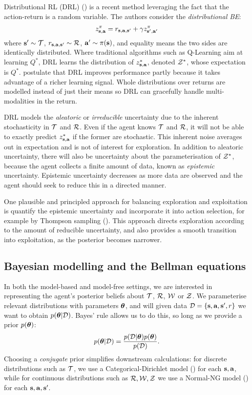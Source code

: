 \documentclass{article}
\begin{document}
Distributional RL (DRL) (\cite{distperrl}) is a recent method leveraging the fact that the action-return is a random variable. The authors consider the \textit{distributional BE}:
\begin{align} \label{eq:distributional}
z^\pi_{\mathbf{s}, \mathbf{a}} = r_{\mathbf{s}, \mathbf{a}, \mathbf{s}'} + \gamma z^\pi_{\mathbf{s}', \mathbf{a}'}
\end{align}
where $\mathbf{s}' \sim \mathcal{T}$, $r_{\mathbf{s}, \mathbf{a}, \mathbf{s}'} \sim \mathcal{R}$, $\mathbf{a}' \sim \pi(\mathbf{s})$, and equality means the two sides are identically distributed. Where traditional algorithms such as Q-Learning aim at learning $Q^*$, DRL learns the distribution of $z^*_{\mathbf{s}, \mathbf{a}}$, denoted $\mathcal{Z}^*$, whose expectation is $Q^*$. \cite{distperrl} postulate that DRL improves performance partly because it takes advantage of a richer learning signal. Whole distributions over returns are modelled instead of just their means so DRL can gracefully handle multi-modalities in the return.

DRL models the \textit{aleatoric} or \textit{irreducible} uncertainty due to the inherent stochasticity in $\mathcal{T}$ and $\mathcal{R}$. Even if the agent knows $\mathcal{T}$ and $\mathcal{R}$, it will not be able to exactly predict $z^*_{\mathbf{s}, \mathbf{a}}$ if the former are stochastic. This inherent noise averages out in expectation and is not of interest for exploration. In addition to aleatoric uncertainty, there will also be uncertainty about the parameterisation of $\mathcal{Z}^*$, because the agent collects a finite amount of data, known as \textit{epistemic} uncertainty. Epistemic uncertainty decreases as more data are observed and the agent should seek to reduce this in a directed manner.

One plausible and principled approach for balancing exploration and exploitation is quantify the epistemic uncertainty and incorporate it into action selection, for example by Thompson sampling (\cite{thompson}). This approach directs exploration according to the amount of reducible uncertainty, and also provides a smooth transition into exploitation, as the posterior becomes narrower. 

\subsection{Bayesian modelling and the Bellman equations}

In both the model-based and model-free settings, we are interested in representing the agent's posterior beliefs about $\mathcal{T}$, $\mathcal{R}$, $\mathcal{W}$ or $\mathcal{Z}$. We parameterise relevant distributions with parameters $\boldsymbol{\theta}$, and will given data $\mathcal{D} = \{\mathbf{s}, \mathbf{a}, \mathbf{s}', r\}$ we want to obtain $p(\boldsymbol{\theta} | \mathcal{D})$. Bayes' rule allows us to do this, so long as we provide a prior $p(\boldsymbol{\theta})$:
\begin{align}
p(\boldsymbol{\theta} | \mathcal{D}) = \frac{p(\mathcal{D} | \boldsymbol{\theta}) p(\boldsymbol{\theta})}{p(\mathcal{D})}.
\end{align}
Choosing a \textit{conjugate} prior simplifies downstream calculations: for discrete distributions such as $\mathcal{T}$, we use a Categorical-Dirichlet model (\cite{murphy}) for each $\mathbf{s}, \mathbf{a}$, while for continuous distributions such as $\mathcal{R}, \mathcal{W}, \mathcal{Z}$ we use a Normal-NG model (\cite{bishop}) for each $\mathbf{s}, \mathbf{a}, \mathbf{s}'$.
\end{document}
